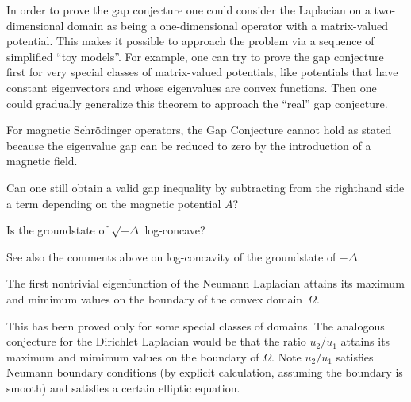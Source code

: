 \documentclass[12pt,letterpaper, reqno]{aimpl}
\begin{document}
\begin{problemblock}

\begin{problem}[3.5]
  In order to prove the gap conjecture one could consider
the Laplacian on a two-dimensional domain as being a one-dimensional
operator with a matrix-valued potential. This makes it possible to
approach the problem via a sequence of simplified ``toy models''.
For example, one can try to prove the gap conjecture first for very
special classes of matrix-valued potentials, like potentials that
have constant eigenvectors and whose eigenvalues are convex
functions. Then one could gradually generalize this theorem to
approach the ``real'' gap conjecture.
\end{problem}

\end{problemblock}

\begin{problemblock}
For magnetic Schr\"{o}\-dinger operators,
the Gap Conjecture cannot hold as stated because the eigenvalue gap
can be reduced to zero by the introduction of a magnetic field.


\begin{problem}[3.55]
Can one still obtain a valid gap inequality by subtracting from the
righthand side a term depending on the magnetic potential $A$?
\end{problem}
\end{problemblock}

\begin{problemblock}
\begin{problem}[3.65]
   Is the groundstate of $\sqrt{-\Delta}$ log-concave?
\end{problem}
See
also the comments above on log-concavity of the groundstate of
$-\Delta$.
\end{problemblock}

\begin{problemblock}
\begin{conjecture}[3.7]
The first nontrivial eigenfunction of the Neumann Laplacian attains
its maximum and mimimum values on the
boundary of the convex domain~$\Omega$.
\end{conjecture}

 This has been proved only for some special classes of
domains. The analogous conjecture for the Dirichlet Laplacian would
be that the ratio $u_2/u_1$ attains its maximum and mimimum values
on the boundary of $\Omega$. Note $u_2/u_1$ satisfies Neumann
boundary conditions (by explicit calculation, assuming the boundary
is smooth) and satisfies a certain elliptic equation.

\end{problemblock}
\end{document}
